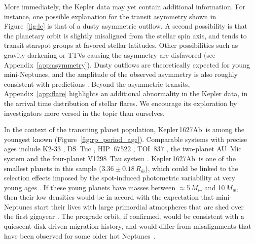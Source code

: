 \documentclass[12pt,modern,twocolumn,tighten]{aastex63}
\newcommand{\pn}{Kepler\,1627Ab} %
\begin{document}
More immediately, the Kepler data may yet contain additional
information.  For instance, one possible explanation for the transit
asymmetry shown in Figure~\ref{fig:lc} is that of a dusty asymmetric
outflow.  
A second possibility is that the planetary orbit is slightly misaligned
from the stellar spin axis, and tends to
transit starspot groups at
favored stellar latitudes.
Other possibilities such as gravity darkening or TTVs causing
the asymmetry are disfavored
(see Appendix~\ref{app:asymmetry}).  Dusty outflows are theoretically
expected for young mini-Neptunes, and the amplitude of the observed
asymmetry is also roughly consistent with predictions
\citep{wang_dai_2019}.  Beyond the asymmetric transits,
Appendix~\ref{app:flare} highlights an additional abnormality in the Kepler
data, in the arrival time distribution of stellar flares.  We
encourage its exploration by investigators more versed in the topic
than ourselves.

In the context of the transiting planet population, \pn\ is among the
youngest known (Figure~\ref{fig:rp_period_age}).  Comparable systems
with precise ages include K2-33
\citep{Mann_K2_33b_2016,David_et_al_2017}, DS~Tuc
\citep{benatti_possibly_2019,newton_tess_2019} , HIP~67522
\citep{rizzuto_tess_2020}, TOI~837
\citep{bouma_cluster_2020}, the two-planet AU~Mic system
\citep{plavchan_planet_2020,martioli_aumicbc_2021} and the four-planet
V1298~Tau system \citep{david_four_2019}.  \pn\ is one of the smallest
planets in this sample ($3.36\pm0.18\,R_\oplus$), which could be linked to the selection effects
imposed by the spot-induced photometric variability at very young ages
\citep[{\it e.g.},][]{zhou_2021_tois}.  If these young
planets have masses between $\approx$5$\,M_\oplus$ and 10$\,M_\oplus$,
then their low densities would be in accord with
the expectation that mini-Neptunes start their lives with large
primordial atmospheres that are shed over the first gigayear
\citep{Owen_Wu_2013,Fulton_et_al_2017,ginzburg_corepowered_2018}.  The
prograde orbit, if confirmed, would be consistent with a quiescent
disk-driven migration history, and would differ from misalignments that
have been observed for some older
hot Neptunes~\citep{sanchis-ojeda_starspots_2011,albrecht_obliquities_2012,dalal_2019_hd3167,rubenzahl_tess-keck_2021}.

\end{document}
